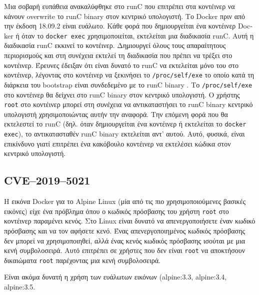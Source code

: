Mια σοβαρή ευπάθεια ανακαλύφθηκε στο \textlatin{runC} που επιτρέπει στα
κοντέινερ να κάνουν \textlatin{overwrite} το \textlatin{runC binary} στον
κεντρικό υπολογιστή. Το \textlatin{Docker} πριν από την έκδοση 18.09.2 είναι
ευάλωτο. Κάθε φορά που δημιουργείται ένα κοντέινερ \textlatin{Docker} ή όταν το
\texttt{\textlatin{docker exec}} χρησιμοποιείται, εκτελείται μια διαδικασία
\textlatin{runC}. Αυτή η διαδικασία \textlatin{runC} εκκινεί το κοντέινερ.
Δημιουργεί όλους τους απαραίτητους περιορισμούς και στη συνέχεια εκτελεί τη
διαδικασία που πρέπει να τρέξει στο κοντέινερ. Έρευνες έδειξαν ότι είναι δυνατό
το runC να εκτελείται μόνο του στο κοντέινερ, λέγοντας στο κοντέινερ να
ξεκινήσει το \texttt{\textlatin{/proc/self/exe}} το οποίο κατά τη διάρκεια του
\textlatin{bootstrap} είναι συνδεδεμένο με το \textlatin{runC binary}
\cite{CVE-2019-5736-DragonSector} \cite{CVE-2019-5736-Github}. Το
\texttt{\textlatin{/proc/self/exe}} στο κοντέινερ θα δείχνει στο \textlatin{runC
binary} στον κεντρικό υπολογιστή. Ο χρήστης \texttt{\textlatin{root}} στο
κοντέινερ μπορεί στη συνέχεια να αντικαταστήσει το \textlatin{runC binary}
κεντρικό υπολογιστή χρησιμοποιώντας αυτήν την αναφορά. Την επόμενη φορά που θα
εκτελεστεί το \textlatin{runC} (δηλ. όταν δημιουργείται ένα κοντέινερ ή
εκτελείται το \texttt{\textlatin{docker exec}}), το αντικατασταθέν
\textlatin{runC binary} εκτελείται αντ' αυτού. Αυτό, φυσικά, είναι επικίνδυνο
γιατί επιτρέπει ένα κακόβουλο κοντέινερ να εκτελέσει κώδικα στον κεντρικό
υπολογιστή.

\subsection{\textlatin{CVE–2019–5021}}

Η εικόνα Docker για το \textlatin{Alpine Linux} (μία από τις πιο
χρησιμοποιούμενες βασικές εικόνες) είχε
ένα πρόβλημα όπου ο κωδικός πρόσβασης του χρήστη \texttt{\textlatin{root}} στο
κοντέινερ παραμένει κενός.
Στο \textlatin{Linux} είναι δυνατό να απενεργοποιήσετε έναν κωδικό πρόσβασης και
να τον αφήσετε κενό. Ένας απενεργοποιημένος κωδικός πρόσβασης δεν μπορεί να
χρησιμοποιηθεί, αλλά ένας κενός κωδικός πρόσβασης ισούται με μια κενή
συμβολοσειρά. Αυτό επιτρέπει σε χρήστες που δεν είναι \texttt{\textlatin{root}}
να αποκτήσουν δικαιώματα \texttt{\textlatin{root}} παρέχοντας μια κενή
συμβολοσειρά.

Είναι ακόμα δυνατή η χρήση των ευάλωτων εικόνων (\textlatin{alpine:3.3,
alpine:3.4, alpine:3.5}. \\

